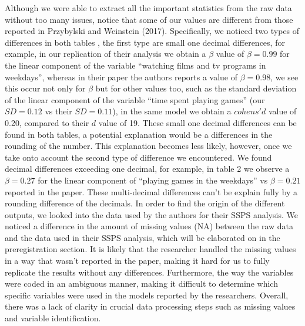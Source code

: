 \documentclass[floatsintext,man]{apa6}
\theoremstyle{definition}
\theoremstyle{definition}
\theoremstyle{definition}
\theoremstyle{remark}
\begin{document}
Although we were able to extract all the important statistics from the
raw data without too many issues, notice that some of our values are
different from those reported in Przybylski and Weinstein (2017).
Specifically, we noticed two types of differences in both tables , the
first type are small one decimal differences, for example, in our
replication of their analysis we obtain a \(\beta\) value of
\(\beta =0.99\) for the linear component of the variable
\enquote{watching films and tv programs in weekdays}, whereas in their
paper the authors reports a value of \(\beta=0.98\), we see this occur
not only for \(\beta\) but for other values too, such as the standard
deviation of the linear component of the variable \enquote{time spent
playing games} (our \(SD =0.12\) vs their \(SD =0.11\)), in the same
model we obtain a \(cohens'd\) value of 0.20, compared to their \(d\)
value of 19. These small one decimal differences can be found in both
tables, a potential explanation would be a differences in the rounding
of the number. This explanation becomes less likely, however, once we
take onto account the second type of difference we encountered. We found
decimal differences exceeding one decimal, for example, in table 2 we
observe a \(\beta =0.27\) for the linear component of \enquote{playing
games in the weekdays} vs \(\beta =0.21\) reported in the paper. These
multi-decimal differences can't be explain fully by a rounding
difference of the decimals. In order to find the origin of the different
outputs, we looked into the data used by the authors for their SSPS
analysis. We noticed a difference in the amount of missing values (NA)
between the raw data and the data used in their SSPS analysis, which
will be elaborated on in the preregistration section. It is likely that
the researcher handled the missing values in a way that wasn't reported
in the paper, making it hard for us to fully replicate the results
without any differences. Furthermore, the way the variables were coded
in an ambiguous manner, making it difficult to determine which specific
variables were used in the models reported by the researchers. Overall,
there was a lack of clarity in crucial data processing steps such as
missing values and variable identification.
\end{document}
